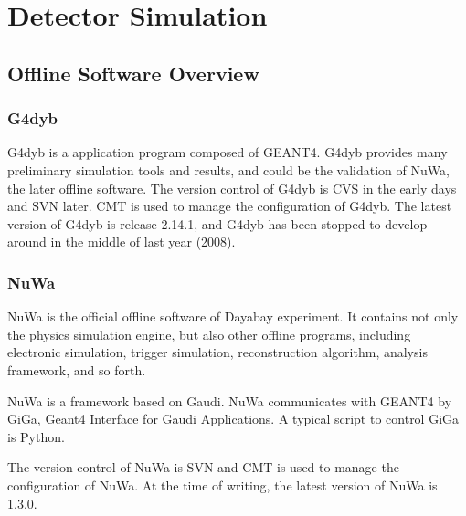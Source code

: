 \chapter {Detector Simulation}

\section {Offline Software Overview}

\subsection {G4dyb}

G4dyb is a application program composed of GEANT4.
G4dyb provides many preliminary simulation tools and results, and could be
the validation of NuWa, the later offline software.
The version control of G4dyb is CVS in the early days and
SVN later. CMT is used to manage the configuration of G4dyb.
The latest version of G4dyb is release 2.14.1, and
G4dyb has been stopped to develop around in the middle of last year (2008).


\subsection {NuWa}

NuWa is the official offline software of Dayabay experiment.
It contains not only the physics simulation engine, but also
other offline programs, including electronic simulation,
trigger simulation, reconstruction algorithm, analysis framework, and so forth.

NuWa is a framework based on Gaudi.
NuWa communicates with GEANT4 by GiGa, Geant4 Interface for Gaudi Applications.
A typical script to control GiGa is Python.


The version control of NuWa is SVN and CMT is used to manage
the configuration of NuWa.
At the time of writing, the latest version of NuWa is 1.3.0.



